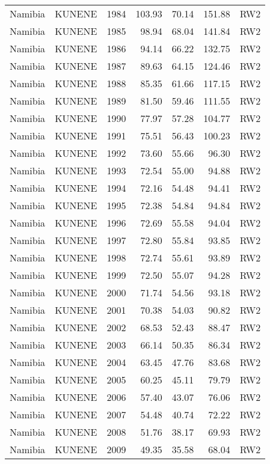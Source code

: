 \begin{longtable}{lllrrrl}
  Namibia & KUNENE & 1984 & 103.93 & 70.14 & 151.88 & RW2 \\ 
  Namibia & KUNENE & 1985 & 98.94 & 68.04 & 141.84 & RW2 \\ 
  Namibia & KUNENE & 1986 & 94.14 & 66.22 & 132.75 & RW2 \\ 
  Namibia & KUNENE & 1987 & 89.63 & 64.15 & 124.46 & RW2 \\ 
  Namibia & KUNENE & 1988 & 85.35 & 61.66 & 117.15 & RW2 \\ 
  Namibia & KUNENE & 1989 & 81.50 & 59.46 & 111.55 & RW2 \\ 
  Namibia & KUNENE & 1990 & 77.97 & 57.28 & 104.77 & RW2 \\ 
  Namibia & KUNENE & 1991 & 75.51 & 56.43 & 100.23 & RW2 \\ 
  Namibia & KUNENE & 1992 & 73.60 & 55.66 & 96.30 & RW2 \\ 
  Namibia & KUNENE & 1993 & 72.54 & 55.00 & 94.88 & RW2 \\ 
  Namibia & KUNENE & 1994 & 72.16 & 54.48 & 94.41 & RW2 \\ 
  Namibia & KUNENE & 1995 & 72.38 & 54.84 & 94.84 & RW2 \\ 
  Namibia & KUNENE & 1996 & 72.69 & 55.58 & 94.04 & RW2 \\ 
  Namibia & KUNENE & 1997 & 72.80 & 55.84 & 93.85 & RW2 \\ 
  Namibia & KUNENE & 1998 & 72.74 & 55.61 & 93.89 & RW2 \\ 
  Namibia & KUNENE & 1999 & 72.50 & 55.07 & 94.28 & RW2 \\ 
  Namibia & KUNENE & 2000 & 71.74 & 54.56 & 93.18 & RW2 \\ 
  Namibia & KUNENE & 2001 & 70.38 & 54.03 & 90.82 & RW2 \\ 
  Namibia & KUNENE & 2002 & 68.53 & 52.43 & 88.47 & RW2 \\ 
  Namibia & KUNENE & 2003 & 66.14 & 50.35 & 86.34 & RW2 \\ 
  Namibia & KUNENE & 2004 & 63.45 & 47.76 & 83.68 & RW2 \\ 
  Namibia & KUNENE & 2005 & 60.25 & 45.11 & 79.79 & RW2 \\ 
  Namibia & KUNENE & 2006 & 57.40 & 43.07 & 76.06 & RW2 \\ 
  Namibia & KUNENE & 2007 & 54.48 & 40.74 & 72.22 & RW2 \\ 
  Namibia & KUNENE & 2008 & 51.76 & 38.17 & 69.93 & RW2 \\ 
  Namibia & KUNENE & 2009 & 49.35 & 35.58 & 68.04 & RW2 \\ 

\end{longtable}
